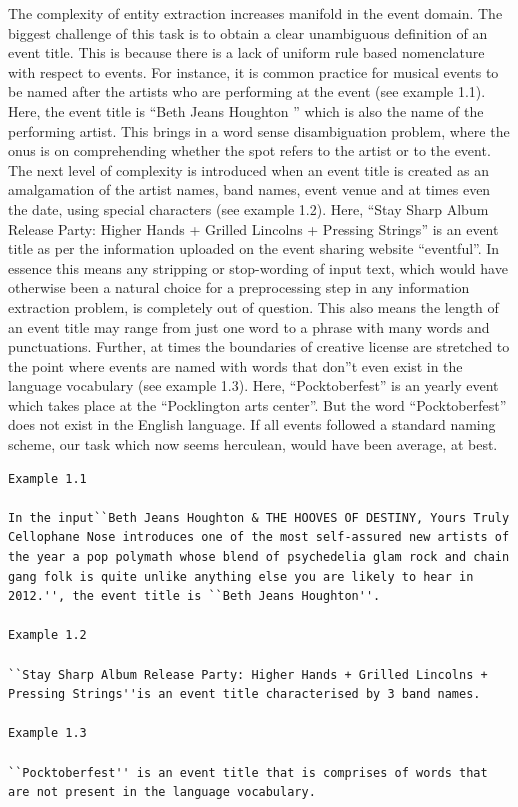 \documentclass[a4paper,11pt]{report}
\begin{document}
The complexity of entity extraction increases manifold in the event domain. The biggest challenge of this task is to obtain a clear unambiguous definition of an event title. This is because there is a lack of uniform rule based nomenclature with respect to events. For instance, it is common practice for musical events to be named after the artists who are performing at the event (see example 1.1). Here, the event title is ``Beth Jeans Houghton '' which is also the name of the performing artist. This brings in a word sense disambiguation problem, where the onus is on comprehending whether the spot refers to the artist or to the event. The next level of complexity is introduced when an event title is created as an amalgamation of the artist names, band names, event venue and at times even the date, using special characters (see example 1.2). Here, ``Stay Sharp Album Release Party: Higher Hands + Grilled Lincolns + Pressing Strings'' is an event title as per the information uploaded on the event sharing website ``eventful''. In essence this means any stripping or stop-wording of input text, which would have otherwise been a natural choice for a preprocessing step in any information extraction problem, is completely out of question. This also means the length of an event title may range from just one word to a phrase with many words and punctuations. Further, at times the boundaries of creative license are stretched to the point where events are named with words that don''t even exist in the language vocabulary (see example 1.3). Here, ``Pocktoberfest'' is an yearly event which takes place at the ``Pocklington arts center''. But the word ``Pocktoberfest'' does not exist in the English language. If all events followed a standard naming scheme, our task which now seems herculean, would have been average, at best.\newline 

\begin{lstlisting}[caption=This listing shows different ways in which event titles are constructed., label=amb]
Example 1.1

In the input``Beth Jeans Houghton & THE HOOVES OF DESTINY, Yours Truly Cellophane Nose introduces one of the most self-assured new artists of the year a pop polymath whose blend of psychedelia glam rock and chain gang folk is quite unlike anything else you are likely to hear in 2012.'', the event title is ``Beth Jeans Houghton''.

Example 1.2

``Stay Sharp Album Release Party: Higher Hands + Grilled Lincolns + Pressing Strings''is an event title characterised by 3 band names.

Example 1.3

``Pocktoberfest'' is an event title that is comprises of words that are not present in the language vocabulary.
\end{lstlisting}
\end{document}
